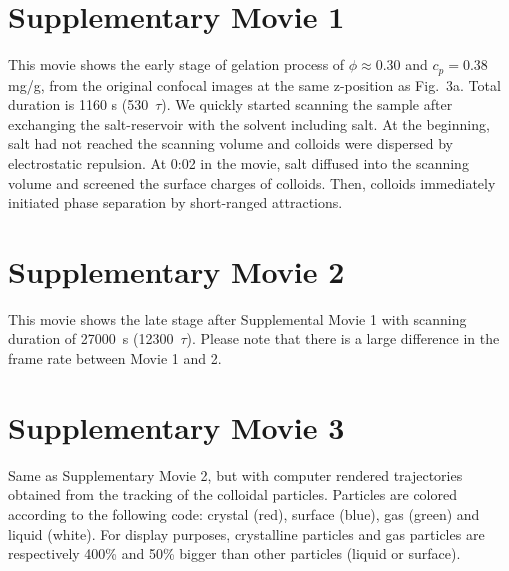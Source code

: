 


\clearpage

\section*{Supplementary Movie 1}
This movie shows the early stage of gelation process of $\phi\approx 0.30$ and $c_p=0.38$ mg/g, from the original confocal images at the same z-position as Fig.~3a. Total duration is 1160 s (530~$\tau$). We quickly started scanning the sample after exchanging the salt-reservoir with the solvent including salt. At the beginning, salt had not reached the scanning volume and colloids were dispersed by electrostatic repulsion. At 0:02 in the movie, salt diffused into the scanning volume and screened the surface charges of colloids. Then, colloids immediately initiated phase separation by short-ranged attractions.

\section*{Supplementary Movie 2}
This movie shows the late stage after Supplemental Movie 1 with scanning duration of 27000~s (12300~$\tau$). 
Please note that there is a large difference in the frame rate between Movie 1 and 2. 

\section*{Supplementary Movie 3}
Same as Supplementary Movie 2, but with computer rendered trajectories obtained from the tracking of the colloidal particles.
Particles are colored according to the following code: crystal (red), surface (blue), gas (green) and liquid (white).
For display purposes, crystalline particles and gas particles are respectively 400\% and 50\% bigger than other particles (liquid or surface).



